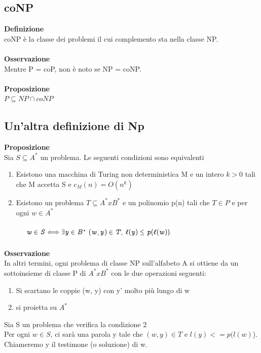 \subsection{coNP}
\textbf{Definizione}\\
coNP è la classe dei problemi il cui complemento sta nella classe NP.\\\\
\textbf{Osservazione}\\
Mentre P = coP, non è noto se NP = coNP.\\\\
\textbf{Proposizione}\\
$P \subseteq NP \cap coNP$
\subsection{Un'altra definizione di Np}
\textbf{Proposizione}\\
Sia $S \subseteq A^*$ un problema. Le seguenti condizioni sono equivalenti
\begin{enumerate}
    \item Esistono una macchina di Turing non deterministica M e un intero $k > 0$ tali che M accetta S e $c_M (n) = O(n^k)$
    
    \item Esistono un problema $T \subseteq A^* x B^*$ e un polinomio p(n) tali che $T \in P$ e per ogni $w \in A^*$
\end{enumerate}
\begin{figure}[htp]
    \centering
    \includegraphics[scale=0.9]{tesi_stile/img/foto3cap11.png}
\end{figure}
\textbf{Osservazione}\\
In altri termini, ogni problema di classe NP  sull’alfabeto A si ottiene da un sottoinsieme di classe P di $A^* x B^*$ con le due operazioni seguenti:
\begin{enumerate}
    \item Si scartano le coppie (w, y) con y' molto più lungo di w
    
    \item si proietta su $A^*$
\end{enumerate}
Sia S un problema che verifica la condizione 2\\
Per ogni $w \in S$, ci sarà una parola y tale che $(w, y) \in T$ e $l(y) <= p(l(w)$).\\
Chiameremo y il testimone (o soluzione) di w.\\
\newpage
